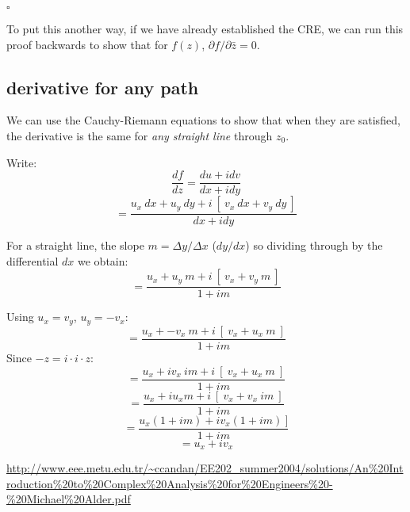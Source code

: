 \documentclass[11pt, oneside]{article}
\begin{document}
$\square$

To put this another way, if we have already established the CRE, we can run this proof backwards to show that for $f(z)$, $\partial f/\partial \bar{z} = 0$.

\subsection*{derivative for any path}
We can use the Cauchy-Riemann equations to show that when they are satisfied, the derivative is the same for \emph{any straight line} through $z_0$.

Write:
\[ \frac{df}{dz} = \frac{du + i dv}{dx + i dy} \]
\[ = \frac{u_x \ dx + u_y \ dy + i \ [ \ v_x \ dx + v_y \ dy \ ]}{dx + i dy} \]

For a straight line, the slope $m = \Delta y/\Delta x$ ($dy/dx$) so dividing through by the differential $dx$ we obtain:
\[ = \frac{u_x + u_y \ m + i \ [ \ v_x + v_y \ m \ ]}{1 + i m} \]

Using $u_x = v_y$, $u_y = - v_x$:
\[ = \frac{u_x + -v_x \ m + i \ [ \ v_x + u_x \ m \ ]}{1 + i m} \]
Since $- z = i \cdot i \cdot z$:
\[ = \frac{u_x + i v_x \ im + i \ [ \ v_x + u_x \ m \ ]}{1 + i m} \]
\[ = \frac{u_x + i u_x m + i \ [ \ v_x +  v_x \ im \ ]}{1 + i m} \]
\[ = \frac{u_x (1 + im) + i v_x (1 + im) \ ]}{1 + i m} \]
\[ = u_x + i v_x  \]

\url{http://www.eee.metu.edu.tr/~ccandan/EE202_summer2004/solutions/An%20Introduction%20to%20Complex%20Analysis%20for%20Engineers%20-%20Michael%20Alder.pdf}
\end{document}

